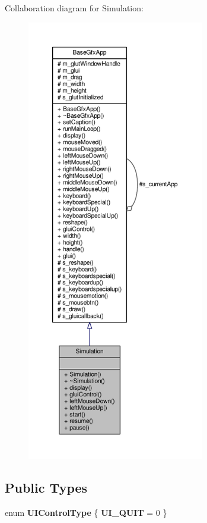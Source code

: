 Collaboration diagram for Simulation\-:\nopagebreak
\begin{figure}[H]
\begin{center}
\leavevmode
\includegraphics[height=550pt]{classSimulation__coll__graph}
\end{center}
\end{figure}
\subsection*{Public Types}
\begin{DoxyCompactItemize}
\item 
enum {\bfseries U\-I\-Control\-Type} \{ {\bfseries U\-I\-\_\-\-Q\-U\-I\-T} = 0
 \}
\end{DoxyCompactItemize}

